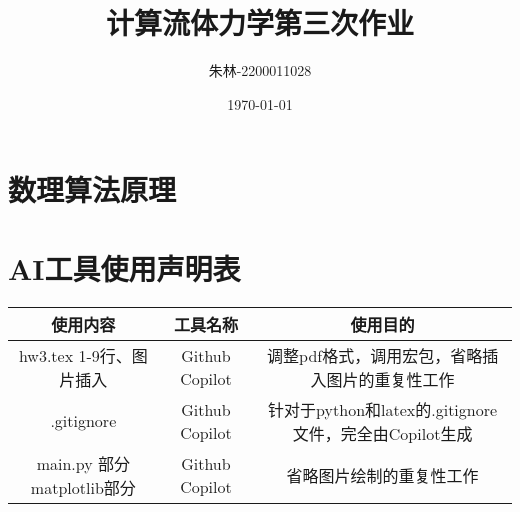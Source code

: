 \documentclass[UTF8]{ctexart}
\begin{document}
\title{计算流体力学第三次作业}
\author{朱林-2200011028}
\date{\today}
\maketitle

\section{数理算法原理}

\newpage
\appendix
\section{AI工具使用声明表}
\begin{table}[H]
    \centering
    \begin{tabular}{c|c|c}
        \hline
        使用内容 & 工具名称 & 使用目的 \\ \hline
        hw3.tex 1-9行、图片插入 & Github Copilot & 调整pdf格式，调用宏包，省略插入图片的重复性工作 \\ 
        .gitignore & Github Copilot & 针对于python和latex的.gitignore文件，完全由Copilot生成  \\
        main.py 部分matplotlib部分 & Github Copilot & 省略图片绘制的重复性工作
    \end{tabular}
    \label{tab:AI_tools}
\end{table}
\end{document}

